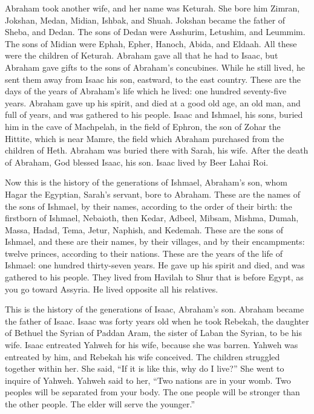  Abraham took another wife, and her name was Keturah.
 She bore him Zimran, Jokshan, Medan, Midian, Ishbak, and
Shuah.  Jokshan became the father of Sheba, and Dedan. The
sons of Dedan were Asshurim, Letushim, and Leummim.  The
sons of Midian were Ephah, Epher, Hanoch, Abida, and Eldaah. All these
were the children of Keturah.  Abraham gave all that he
had to Isaac,  but Abraham gave gifts to the sons of
Abraham's concubines. While he still lived, he sent them away from Isaac
his son, eastward, to the east country.  These are the
days of the years of Abraham's life which he lived: one hundred
seventy-five years.  Abraham gave up his spirit, and died
at a good old age, an old man, and full of years, and was gathered to
his people.  Isaac and Ishmael, his sons, buried him in
the cave of Machpelah, in the field of Ephron, the son of Zohar the
Hittite, which is near Mamre,  the field which Abraham
purchased from the children of Heth. Abraham was buried there with
Sarah, his wife.  After the death of Abraham, God blessed
Isaac, his son. Isaac lived by Beer Lahai Roi.

 Now this is the history of the generations of Ishmael,
Abraham's son, whom Hagar the Egyptian, Sarah's servant, bore to
Abraham.  These are the names of the sons of Ishmael, by
their names, according to the order of their birth: the firstborn of
Ishmael, Nebaioth, then Kedar, Adbeel, Mibsam,  Mishma,
Dumah, Massa,  Hadad, Tema, Jetur, Naphish, and Kedemah.
 These are the sons of Ishmael, and these are their
names, by their villages, and by their encampments: twelve princes,
according to their nations.  These are the years of the
life of Ishmael: one hundred thirty-seven years. He gave up his spirit
and died, and was gathered to his people.  They lived
from Havilah to Shur that is before Egypt, as you go toward Assyria. He
lived opposite all his relatives.

 This is the history of the generations of Isaac,
Abraham's son. Abraham became the father of Isaac.  Isaac
was forty years old when he took Rebekah, the daughter of Bethuel the
Syrian of Paddan Aram, the sister of Laban the Syrian, to be his wife.
 Isaac entreated Yahweh for his wife, because she was
barren. Yahweh was entreated by him, and Rebekah his wife conceived.
 The children struggled together within her. She said,
``If it is like this, why do I live?'' She went to inquire of Yahweh.
 Yahweh said to her, ``Two nations are in your womb. Two
peoples will be separated from your body. The one people will be
stronger than the other people. The elder will serve the younger.''

